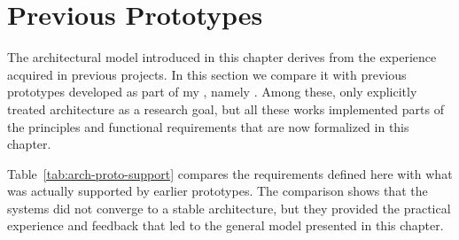 \section{Previous Prototypes}
\label{sec:arch_proto}

The architectural model introduced in this chapter derives from the experience acquired in previous projects. In this section we compare it with previous prototypes developed as part of my \phd, namely \textcite{BELLANDI2024,pozzi_wise_2025,Agazzi2025DAVE}. Among these, only \textcite{BELLANDI2024} explicitly treated architecture as a research goal, but all these works implemented parts of the principles and functional requirements that are now formalized in this chapter.


Table~\ref{tab:arch-proto-support} compares the requirements defined here with what was actually supported by earlier prototypes. The comparison shows that the systems did not converge to a stable architecture, but they provided the practical experience and feedback that led to the general model presented in this chapter.


